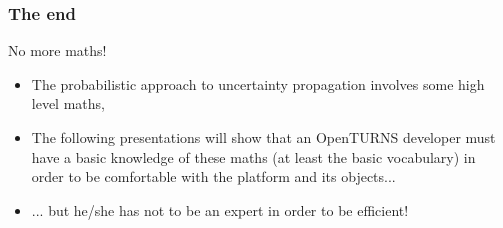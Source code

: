 \documentclass[8pt]{beamer}
\begin{document}
\begin{frame}
\LARGE
  \frametitle{The end}
  \begin{block}{No more maths!}
    \begin{itemize}
    \item The probabilistic approach to uncertainty propagation involves some high level maths,
    \item The following presentations will show that an OpenTURNS developer must have a basic knowledge of these maths (at least the basic vocabulary) in order to be comfortable with the platform and its objects...
    \item ... but he/she has not to be an expert in order to be efficient!
    \end{itemize}
  \end{block}
\end{frame}
\end{document}
